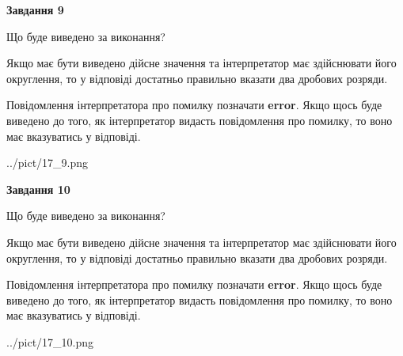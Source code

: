 \documentclass[12pt, ukrainian]{article}
\begin{document}
{\begin {Large}
{\begin {center}\textbf{Завдання 9}\end {center}}\par
Що буде виведено за виконання? \par

Якщо має бути виведено дійсне значення та інтерпретатор має здійснювати його округлення, 
то у відповіді достатньо правильно вказати два дробових розряди.

Повідомлення інтерпретатора про помилку позначати \textbf{error}.
Якщо щось буде виведено до того, як інтерпретатор видасть повідомлення про помилку, 
то воно має вказуватись у відповіді. \par

\begin{center}
	{../pict/17_9.png}
\end{center}
\newpage

{\begin {center}\textbf{Завдання 10}\end {center}}\par
Що буде виведено за виконання? \par

Якщо має бути виведено дійсне значення та інтерпретатор має здійснювати його округлення, 
то у відповіді достатньо правильно вказати два дробових розряди.

Повідомлення інтерпретатора про помилку позначати \textbf{error}.
Якщо щось буде виведено до того, як інтерпретатор видасть повідомлення про помилку, 
то воно має вказуватись у відповіді. \par

\begin{center}
	{../pict/17_10.png}
\end{center}
\newpage

\end {Large}}
\end{document}
